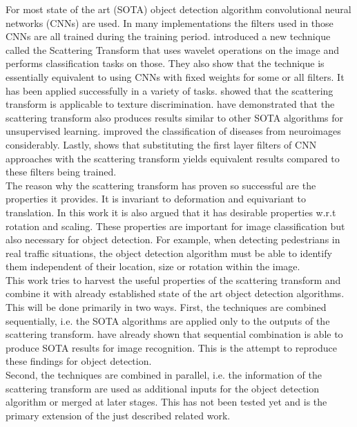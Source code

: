 For most state of the art (SOTA) object detection algorithm convolutional neural networks (CNNs) are used. In many implementations the filters used in those CNNs are all trained during the training period. \cite{scatteringTransform2012}
introduced a new technique called the Scattering Transform that uses wavelet operations on the image and performs classification tasks on those. They also show that the technique is essentially equivalent to using CNNs with fixed weights for some or all filters. It has been applied successfully in a variety of tasks. \cite{InvariantScatteringTextureDiscrimination2013} showed that the scattering transform is applicable to texture discrimination. \cite{DeepRotoTranslation2014} have demonstrated that the scattering transform also produces results similar to other SOTA algorithms for unsupervised learning. \cite{3DScatteringTransformNeuro2017} improved the classification of diseases from neuroimages considerably. Lastly, \cite{ScalingTheScatteringTransform2017} shows that substituting the first layer filters of CNN approaches with the scattering transform yields equivalent results compared to these filters being trained.\\
The reason why the scattering transform has proven so successful are the properties it provides. It is invariant to deformation and equivariant to translation. In this work it is also argued that it has desirable properties w.r.t rotation and scaling. These properties are important for image classification but also necessary for object detection. For example, when detecting pedestrians in real traffic situations, the object detection algorithm must be able to identify them independent of their location, size or rotation within the image. \\
This work tries to harvest the useful properties of the scattering transform and combine it with already established state of the art object detection algorithms. This will be done primarily in two ways. First, the techniques are combined sequentially, i.e. the SOTA algorithms are applied only to the outputs of the scattering transform. \cite{ScalingTheScatteringTransform2017}
have already shown that sequential combination is able to produce SOTA results for image recognition. This is the attempt to reproduce these findings for object detection. \\
Second, the techniques are combined in parallel, i.e. the information of the scattering transform are used as additional inputs for the object detection algorithm or merged at later stages. This has not been tested yet and is the primary extension of the just described related work.\\
